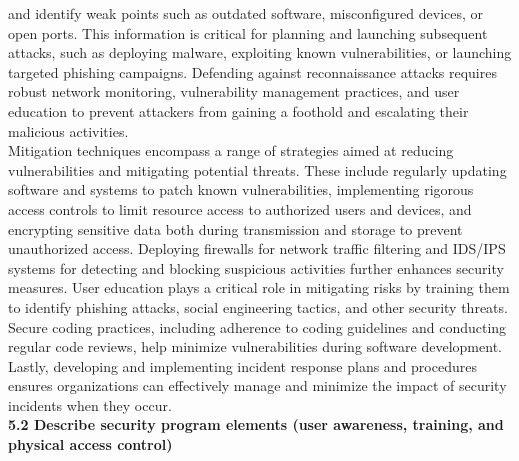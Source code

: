 \documentclass{article}
\begin{document}
and identify weak points such as outdated software, misconfigured devices, or open ports. This information is critical for planning and launching subsequent attacks, such as deploying malware, exploiting known vulnerabilities, or launching targeted phishing campaigns. Defending against reconnaissance attacks requires robust network monitoring, vulnerability management practices, and user education to prevent attackers from gaining a foothold and escalating their malicious activities.\\
	
	Mitigation techniques encompass a range of strategies aimed at reducing vulnerabilities and mitigating potential threats. These include regularly updating software and systems to patch known vulnerabilities, implementing rigorous access controls to limit resource access to authorized users and devices, and encrypting sensitive data both during transmission and storage to prevent unauthorized access. Deploying firewalls for network traffic filtering and IDS/IPS systems for detecting and blocking suspicious activities further enhances security measures. User education plays a critical role in mitigating risks by training them to identify phishing attacks, social engineering tactics, and other security threats. Secure coding practices, including adherence to coding guidelines and conducting regular code reviews, help minimize vulnerabilities during software development. Lastly, developing and implementing incident response plans and procedures ensures organizations can effectively manage and minimize the impact of security incidents when they occur.\\
  
\textbf{5.2 Describe security program elements (user awareness, training, and physical access control)}\\
\end{document}
